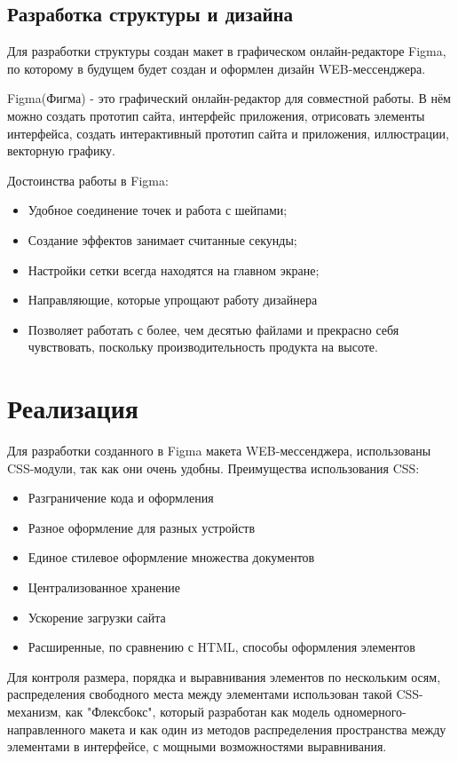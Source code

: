 \documentclass[14pt,final]{report}
\begin{document}
\section{Разработка структуры и дизайна}
Для разработки структуры создан макет в графическом онлайн-редакторе Figma, по которому в будущем будет создан и оформлен дизайн WEB-мессенджера.
\newline
\par Figma(Фигма) - это графический онлайн-редактор для совместной работы. В нём можно создать прототип сайта, интерфейс приложения, отрисовать элементы интерфейса, создать интерактивный прототип сайта и приложения, иллюстрации, векторную графику. 
\par Достоинства работы в Figma:
\begin{itemize}
    \item Удобное соединение точек и работа с шейпами;
    \item Создание эффектов занимает считанные секунды;
    \item Настройки сетки всегда находятся на главном экране;
    \item Направляющие, которые упрощают работу дизайнера
    \item Позволяет работать с более, чем десятью файлами и прекрасно себя чувствовать, поскольку производительность продукта на высоте.
\end{itemize}

\chapter{Реализация}
Для разработки созданного в Figma макета WEB-мессенджера, использованы CSS-модули, так как они очень удобны.
\newline Преимущества использования CSS:
\begin{itemize}
    \item Разграничение кода и оформления
    \item Разное оформление для разных устройств
    \item Единое стилевое оформление множества документов
    \item Централизованное хранение
    \item Ускорение загрузки сайта
    \item Расширенные, по сравнению с HTML, способы оформления элементов
\end{itemize}
Для контроля размера, порядка и выравнивания элементов по нескольким осям, распределения свободного места между элементами использован такой CSS-механизм, как "Флексбокс", который разработан как модель одномерного-направленного макета и как один из методов распределения пространства между элементами в интерфейсе, с мощными возможностями выравнивания.
\end{document}
